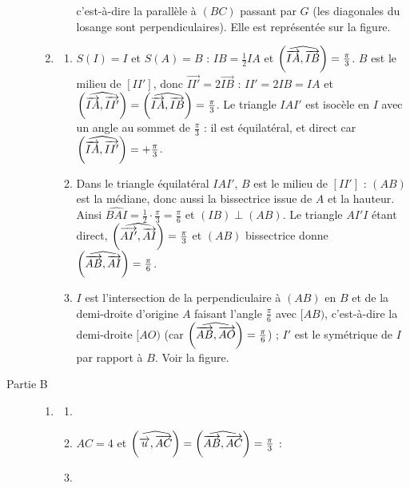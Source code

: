 \begin{description}
\begin{enumerate}
\begin{enumerate}
				c'est-à-dire la parallèle à $(BC)$ passant par $G$ (les diagonales du losange sont perpendiculaires). Elle est représentée sur la figure.
		\end{enumerate}
		\item
		\begin{enumerate}
			\item {}
				$S(I) = I$ et $S(A) = B$ : $IB = \frac{1}{2} IA$ et $\left( \widehat{ \overrightarrow{IA} , \overrightarrow{IB} } \right) = \frac{\pi}{3}$.
				$B$ est le milieu de $[II']$, donc $\overrightarrow{II'} = 2\overrightarrow{IB}$ : $II' = 2IB = IA$ et $\left( \widehat{ \overrightarrow{IA} , \overrightarrow{II'} } \right) = \left( \widehat{ \overrightarrow{IA} , \overrightarrow{IB} } \right) = \frac{\pi}{3}$.
				Le triangle $IAI'$ est isocèle en $I$ avec un angle au sommet de $\frac{\pi}{3}$ : il est équilatéral, et direct car $\left( \widehat{ \overrightarrow{IA} , \overrightarrow{II'} } \right) = +\frac{\pi}{3}$.
				\par\noindent{}
			\item {}
				Dans le triangle équilatéral $IAI'$, $B$ est le milieu de $[II']$ : $(AB)$ est la médiane, donc aussi la bissectrice issue de $A$ et la hauteur.
				Ainsi $\widehat{BAI} = \frac{1}{2} \cdot \frac{\pi}{3} = \frac{\pi}{6}$ et $(IB) \perp (AB)$.
				Le triangle $AI'I$ étant direct, $\left( \widehat{ \overrightarrow{AI'} , \overrightarrow{AI} } \right) = \frac{\pi}{3}$ et $(AB)$ bissectrice donne $\left( \widehat{ \overrightarrow{AB} , \overrightarrow{AI} } \right) = \frac{\pi}{6}$.
				\par\noindent{}
			\item {}
				$I$ est l'intersection de la perpendiculaire à $(AB)$ en $B$ et de la demi-droite d'origine $A$ faisant l'angle $\frac{\pi}{6}$ avec $[AB)$, c'est-à-dire la demi-droite $[AO)$
				(car $\left( \widehat{ \overrightarrow{AB} , \overrightarrow{AO} } \right) = \frac{\pi}{6}$) ; $I'$ est le symétrique de $I$ par rapport à $B$. Voir la figure.
		\end{enumerate}
	\end{enumerate}
	\item[Partie B]
	\begin{enumerate}
		\item
		\begin{enumerate}
			\item {}
			\item {}
				$AC = 4$ et $\left( \widehat{ \overrightarrow{u} , \overrightarrow{AC} } \right) = \left( \widehat{ \overrightarrow{AB} , \overrightarrow{AC} } \right) = \frac{\pi}{3}$ : \par\noindent{}
			\item {}

\end{enumerate}
\end{enumerate}
\end{description}
